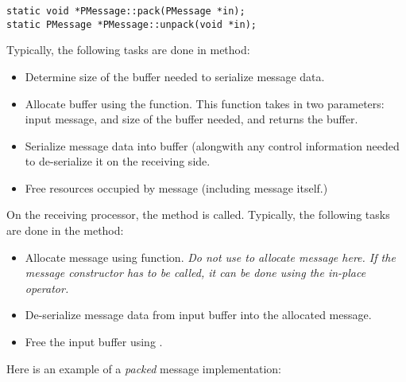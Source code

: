 \begin{verbatim}
static void *PMessage::pack(PMessage *in);
static PMessage *PMessage::unpack(void *in);
\end{verbatim}

Typically, the following tasks are done in  method:

\begin{itemize}
\item Determine size of the buffer needed to serialize message data.
\item Allocate buffer using the 
 function. This
function takes in two parameters: input message, and size of the
buffer needed, and returns the buffer.
\item Serialize message data into buffer (alongwith any control
information needed to de-serialize it on the receiving side.
\item Free resources occupied by message (including message itself.)  
\end{itemize}

On the receiving processor, the  method is
called. Typically, the following tasks are done in the 
method:

\begin{itemize}
\item Allocate message using  function. {\em Do not
use  to allocate message here. If the message constructor has
to be called, it can be done using the in-place  
operator.}
\item De-serialize message data from input buffer into the allocated message.
\item Free the input buffer using .
\end{itemize}

Here is an example of a {\em packed} message implementation:

